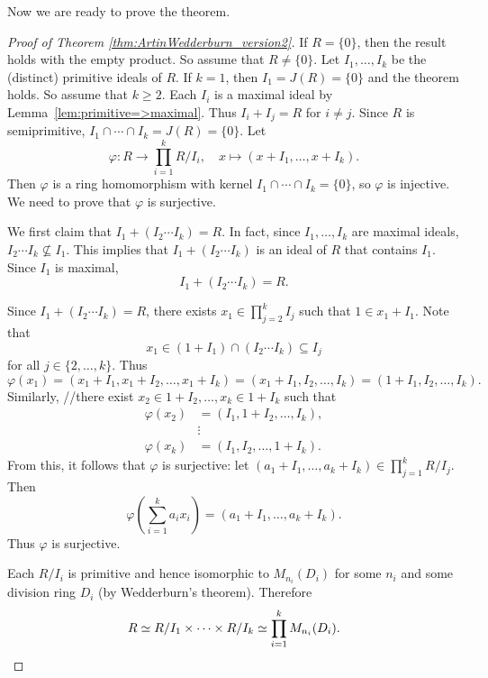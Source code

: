 Now we are ready to prove the theorem. 

\begin{proof}[Proof of Theorem \ref{thm:ArtinWedderburn_version2}]
	If $R=\{0\}$, then the result holds with the empty product. So assume that $R\ne\{0\}$. 
    Let $I_1,\dots,I_k$ be the (distinct) primitive ideals of $R$. If $k=1$, then $I_1=J(R)=\{0\}$ and 
	the theorem holds. So assume that $k\geq2$. 
    Each $I_i$ is a maximal ideal by Lemma~\ref{lem:primitive=>maximal}. Thus $I_i+I_j=R$ for
    $i\ne j$. Since $R$ is semiprimitive, 
    $I_1\cap\cdots\cap I_k=J(R)=\{0\}$. Let 
    \[
    \varphi\colon R\to \prod_{i=1}^k R/I_i,\quad
    x\mapsto (x+I_1,\dots,x+I_k).
    \]
    Then $\varphi$ is a ring homomorphism with kernel $I_1\cap\cdots\cap I_k=\{0\}$, so
    $\varphi$ is injective. We need to prove that $\varphi$ is surjective. 
    
    We first claim that 
    $I_1+( I_2\cdots I_k) = R$. In fact, 
    since $I_1,\dots,I_k$ are maximal ideals, $I_2\cdots I_k\not\subseteq I_1$. This implies
    that $I_1+(I_2\cdots I_k)$ is an ideal of $R$ that contains $I_1$. Since $I_1$ is maximal, 
    \[
    I_1+(I_2\cdots I_k)=R.
    \]
    
    Since $I_1+( I_2\cdots I_k) = R$, 
    there exists $x_1\in \prod_{j=2}^kI_j$ such that $1\in x_1+I_1$. Note that
    \[
    x_1\in (1+I_1)\cap (I_2\cdots I_k)\subseteq I_j
    \]
    for all $j\in\{2,\dots,k\}$. 
    Thus 
    \[
    \varphi(x_1)=(x_1+I_1,x_1+I_2,\dots,x_1+I_k)=(x_1+I_1,I_2,\dots, I_k)=(1+I_1,I_2,\dots, I_k).
    \]
    Similarly,
    //there exist $x_2\in 1+I_2,\dots, x_k\in 1+I_k$ such that 
    \begin{align*}
    \varphi(x_2)&=(I_1,1+I_2,\dots,I_k),\\
    &\vdots\\
    \varphi(x_k)&=(I_1,I_2,\dots,1+I_k).
    \end{align*}
    From this, it follows that $\varphi$ is surjective: 
	let $(a_1+I_1,\dots,a_k+I_k)\in\prod_{j=1}^kR/I_j$.  
	Then
	\[
  		\varphi\left(\sum_{i=1}^k a_i x_i\right)
  		=(a_1+I_1,\dots,a_k+I_k).
	\]
	Thus $\varphi$ is surjective.
    
    Each $R/I_i$ 
    is primitive and hence isomorphic to $M_{n_i}(D_i)$ for some 
    $n_i$ and some division ring $D_i$ (by Wedderburn's theorem). Therefore
    \[
    R\simeq R/I_1\times\cdots\times R/I_k\simeq \prod_{i=1}^kM_{n_i}(D_i).\qedhere 
    \]
\end{proof}



